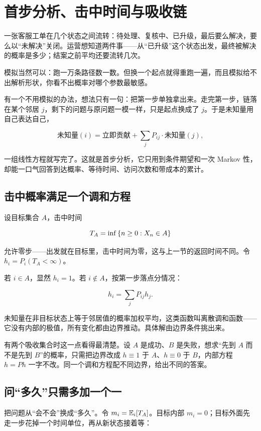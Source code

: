 \section{首步分析、击中时间与吸收链}
\label{sec:06-Random-Processes/03-Markov-Chains/05}

一张客服工单在几个状态之间流转：待处理、复核中、已升级，最后要么解决，要么以``未解决''关闭。运营想知道两件事——从``已升级''这个状态出发，最终被解决的概率是多少；结案之前平均还要流转几次。

模拟当然可以：跑一万条路径数一数。但换一个起点就得重跑一遍，而且模拟给不出解析形状，你看不出概率对哪个参数最敏感。

有一个不用模拟的办法，想法只有一句：把第一步单独拿出来。走完第一步，链落在某个邻居 \(j\)，剩下的问题与原问题一模一样，只是起点换成了 \(j\)。于是未知量用自己表达自己，

\[
\text{未知量}(i)=\text{立即贡献}+\sum_j P_{ij}\cdot\text{未知量}(j),
\]

一组线性方程就写完了。这就是首步分析，它只用到条件期望和一次 Markov 性，却能一口气回答到达概率、等待时间、访问次数和带成本的累计。

\subsection{击中概率满足一个调和方程}

设目标集合 \(A\)，击中时间

\[
T_A=\inf\left\{n\ge0:X_n\in A\right\}
\]

允许零步——出发就在目标里，击中时间为零，这与上一节的返回时间不同。令 \(h_i=P_i(T_A<\infty)\)。

若 \(i\in A\)，显然 \(h_i=1\)。若 \(i\notin A\)，按第一步落点分情况：

\[
h_i=\sum_j P_{ij}h_j.
\]

未知量在非目标状态上等于邻居值的概率加权平均，这类函数叫离散调和函数——它没有内部的极值，所有变化都由边界推动。具体解由边界条件挑出来。

有两个吸收集合时这一点看得最清楚。设 \(A\) 是成功、\(B\) 是失败，想求``先到 \(A\) 而不是先到 \(B\)''的概率，只需把边界改成 \(h\equiv1\) 于 \(A\)、\(h\equiv0\) 于 \(B\)，内部方程 \(h=Ph\) 一字不改。同一个调和方程配不同边界，给出不同的答案。

\subsection{问``多久''只需多加一个一}

把问题从``会不会''换成``多久''。令 \(m_i=\mathbb{E}_i[T_A]\)。目标内部 \(m_i=0\)；目标外面先走一步花掉一个时间单位，再从新状态接着等：

